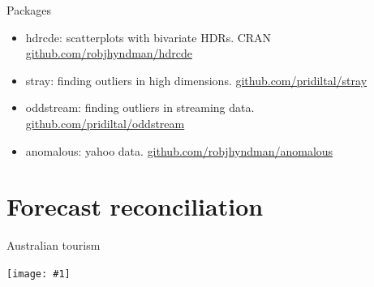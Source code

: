 \documentclass[14pt,ignorenonframetext,]{beamer}
\def\full#1{\vspace*{0.2cm}\par\centerline{\colorbox{white}{\texttt{[image: \#1]}}}}
\begin{document}
\begin{frame}{Packages}
\protect\hypertarget{packages}{}

\fontsize{14.5}{18}\sf

\begin{itemize}
\item
  \alert{hdrcde}: scatterplots with bivariate HDRs. \newline CRAN
  \textbar{} \url{github.com/robjhyndman/hdrcde}\vspace*{0.4cm}
\item
  \alert{stray}: finding outliers in high dimensions.
  \newline\url{github.com/pridiltal/stray}\vspace*{0.4cm}
\item
  \alert{oddstream}: finding outliers in streaming data.
  \newline\url{github.com/pridiltal/oddstream}\vspace*{0.4cm}
\item
  \alert{anomalous}: yahoo data.
  \newline\url{github.com/robjhyndman/anomalous}
\end{itemize}

\end{frame}

\hypertarget{forecast-reconciliation}{%
\section{Forecast reconciliation}\label{forecast-reconciliation}}

\begin{frame}{Australian tourism}
\protect\hypertarget{australian-tourism}{}

\full{regions1_with_labels}

\end{frame}
\end{document}
